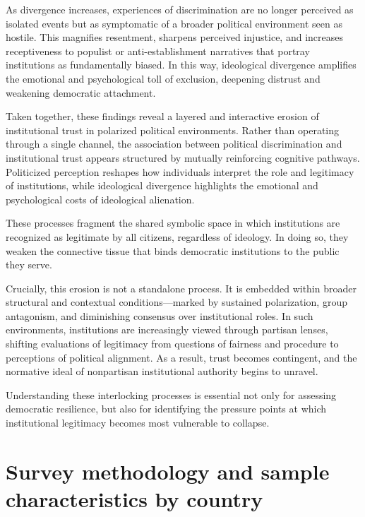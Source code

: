 \documentclass{article}
\begin{document}
As divergence increases, experiences of discrimination are no longer perceived as isolated events but as symptomatic of a broader political environment seen as hostile. This magnifies resentment, sharpens perceived injustice, and increases receptiveness to populist or anti-establishment narratives that portray institutions as fundamentally biased. In this way, ideological divergence amplifies the emotional and psychological toll of exclusion, deepening distrust and weakening democratic attachment.

Taken together, these findings reveal a layered and interactive erosion of institutional trust in polarized political environments. Rather than operating through a single channel, the association between political discrimination and institutional trust appears structured by mutually reinforcing cognitive pathways. Politicized perception reshapes how individuals interpret the role and legitimacy of institutions, while ideological divergence highlights the emotional and psychological costs of ideological alienation.

These processes fragment the shared symbolic space in which institutions are recognized as legitimate by all citizens, regardless of ideology. In doing so, they weaken the connective tissue that binds democratic institutions to the public they serve.

Crucially, this erosion is not a standalone process. It is embedded within broader structural and contextual conditions—marked by sustained polarization, group antagonism, and diminishing consensus over institutional roles. In such environments, institutions are increasingly viewed through partisan lenses, shifting evaluations of legitimacy from questions of fairness and procedure to perceptions of political alignment. As a result, trust becomes contingent, and the normative ideal of nonpartisan institutional authority begins to unravel.

Understanding these interlocking processes is essential not only for assessing democratic resilience, but also for identifying the pressure points at which institutional legitimacy becomes most vulnerable to collapse.

\printbibliography

\newpage
\appendix
\section{Survey methodology and sample characteristics by country}
\label{appendix:a}

\end{document}
